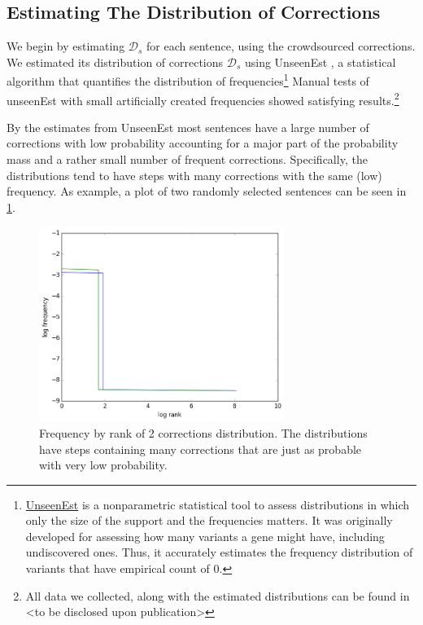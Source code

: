 \documentclass[letter,11pt]{article}
\begin{document}
\subsection{Estimating The Distribution of Corrections}

We begin by estimating $\mathcal{D}_s$ for each sentence, using the crowdsourced
corrections. We estimated its distribution of corrections $\mathcal{D}_s$
using {\sc UnseenEst} \cite{zou2015quantifying}, a statistical algorithm that quantifies
the distribution of frequencies\footnote{\href{https://github.com/borgr/unseenest}{UnseenEst} is a nonparametric statistical tool to assess distributions in which only the size of the support and the frequencies matters. It was originally developed for assessing how many variants a gene might have, including undiscovered ones. Thus, it accurately estimates the frequency distribution of variants that have empirical count of 0. } Manual tests of unseenEst with small artificially created frequencies showed
satisfying results.\footnote{All data
  we collected, along with the estimated distributions can be found in <to be disclosed
  upon publication>}

By the estimates from {\sc UnseenEst} most sentences have a large number of corrections with low probability accounting for a major part of the probability mass and a rather small number of frequent corrections. Specifically, the distributions tend to have steps with many corrections with the same (low) frequency. As example, a plot of two randomly selected sentences can be seen in \ref{fig:corrections_dist}.

\begin{figure}
	\includegraphics[width = 8cm]{exact_dists_plot}
	\caption{Frequency by rank of 2 corrections distribution. The distributions have steps containing many corrections that are just as probable with very low probability. 	\label{fig:corrections_dist}}
\end{figure}
\end{document}
